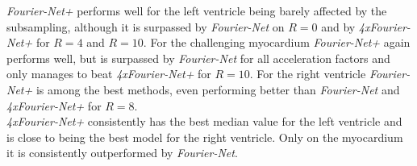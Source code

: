 \documentclass[english,version-2022-01]{uzl-thesis} %
\begin{document}
\emph{Fourier-Net+} performs well for the left ventricle being barely affected by the subsampling, although it is surpassed by \emph{Fourier-Net} on $R=0$ and by \emph{4xFourier-Net+} for $R=4$ and $R=10$. For the challenging myocardium \emph{Fourier-Net+} again performs well, but is surpassed by \emph{Fourier-Net} for all acceleration factors and only manages to beat \emph{4xFourier-Net+} for $R=10$. For the right ventricle \emph{Fourier-Net+} is among the best methods, even performing better than \emph{Fourier-Net} and \emph{4xFourier-Net+}  for $R=8$.\\
\emph{4xFourier-Net+} consistently has the best median value for the left ventricle and is close to being the best model for the right ventricle. Only on the myocardium it is consistently outperformed by \emph{Fourier-Net}.
\end{document}
